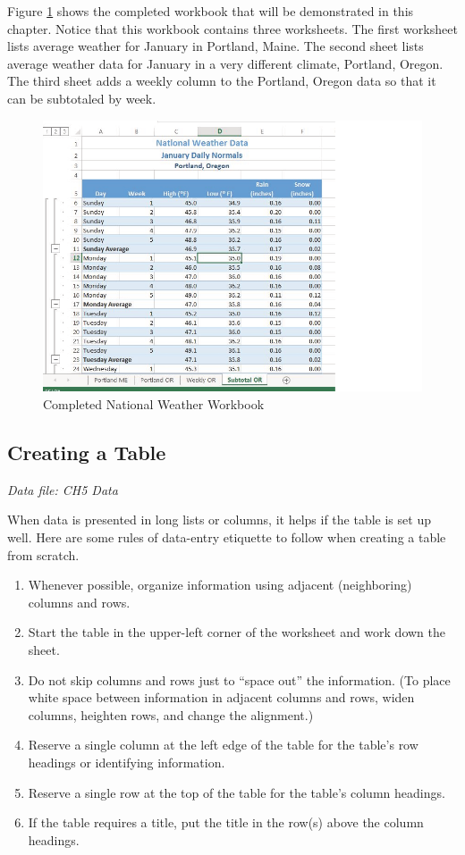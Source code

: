 Figure \ref{05:fig01} shows the completed workbook that will be demonstrated in this chapter. Notice that this workbook contains three worksheets. The first worksheet lists average weather for January in Portland, Maine. The second sheet lists average weather data for January in a very different climate, Portland, Oregon. The third sheet adds a weekly column to the Portland, Oregon data so that it can be subtotaled by week.

\begin{figure}[H]
	\centering
	\includegraphics[width=\maxwidth{.95\linewidth}]{gfx/ch05_fig01}
	\caption{Completed National Weather Workbook}
	\label{05:fig01}
\end{figure}

\subsection{Creating a Table}

\textit{Data file: CH5 Data}

When data is presented in long lists or columns, it helps if the table is set up well. Here are some rules of data-entry etiquette to follow when creating a table from scratch.

\begin{enumerate}
	\item Whenever possible, organize information using adjacent (neighboring) columns and rows.
	\item Start the table in the upper-left corner of the worksheet and work down the sheet.
	\item Do not skip columns and rows just to ``space out'' the information. (To place white space between information in adjacent columns and rows, widen columns, heighten rows, and change the alignment.)
	\item Reserve a single column at the left edge of the table for the table's row headings or identifying information.
	\item Reserve a single row at the top of the table for the table's column headings.
	\item If the table requires a title, put the title in the row(s) above the column headings.
\end{enumerate}

